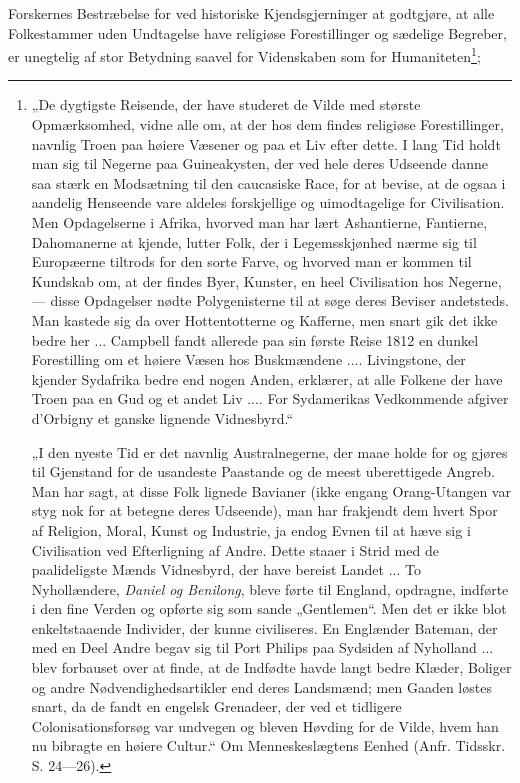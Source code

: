 \documentclass[12pt,a4paper]{book}
\begin{document}
Forskernes Bestræbelse for ved historiske Kjendsgjerninger at godtgjøre, at alle
Folkestammer uden Undtagelse have religiøse Forestillinger og sædelige Begreber,
er unegtelig af stor Betydning saavel for Videnskaben som for
Humaniteten\footnote{„De dygtigste Reisende, der have studeret de Vilde med
største Opmærksomhed, vidne alle om, at der hos dem findes religiøse
Forestillinger, navnlig Troen paa høiere Væsener og paa et Liv efter dette. I
lang Tid holdt man sig til Negerne paa Guineakysten, der ved hele deres Udseende
danne saa stærk en Modsætning til den caucasiske Race, for at bevise, at de
ogsaa i aandelig Henseende vare aldeles forskjellige og uimodtagelige for
Civilisation. Men Opdagelserne i Afrika, hvorved man har lært Ashantierne,
Fantierne, Dahomanerne at kjende, lutter Folk, der i Legemsskjønhed nærme sig
til Europæerne tiltrods for den sorte Farve, og hvorved man er kommen til
Kundskab om, at der findes Byer, Kunster, en heel Civilisation hos Negerne, ---
disse Opdagelser nødte Polygenisterne til at søge deres Beviser andetsteds. Man
kastede sig da over Hottentotterne og Kafferne, men snart gik det ikke bedre her
... Campbell fandt allerede paa sin første Reise 1812 en dunkel Forestilling om
et høiere Væsen hos Buskmændene .... Livingstone, der kjender Sydafrika bedre
end nogen Anden, erklærer, at alle Folkene der have Troen paa en Gud og et andet
Liv .... For Sydamerikas Vedkommende afgiver d'Orbigny et ganske lignende
Vidnesbyrd.“

„I den nyeste Tid er det navnlig Australnegerne, der maae holde for og gjøres
til Gjenstand for de usandeste Paastande og de meest uberettigede Angreb. Man
har sagt, at disse Folk lignede Bavianer (ikke engang Orang-Utangen var styg nok
for at betegne deres Udseende), man har frakjendt dem hvert Spor af Religion,
Moral, Kunst og Industrie, ja endog Evnen til at hæve sig i Civilisation ved
Efterligning af Andre. Dette staaer i Strid med de paalideligste Mænds
Vidnesbyrd, der have bereist Landet ... To Nyhollændere, \emph{Daniel og
Benilong}, bleve førte til England, opdragne, indførte i den fine Verden og
opførte sig som sande „Gentlemen“. Men det er ikke blot enkeltstaaende
Individer, der kunne civiliseres. En Englænder Bateman, der med en Deel Andre
begav sig til Port Philips paa Sydsiden af Nyholland ... blev forbauset over at
finde, at de Indfødte havde langt bedre Klæder, Boliger og andre
Nødvendighedsartikler end deres Landsmænd; men Gaaden løstes snart, da de fandt
en engelsk Grenadeer, der ved et tidligere Colonisationsforsøg var undvegen og
bleven Høvding for de Vilde, hvem han nu bibragte en høiere Cultur.“ Om
Menneskeslægtens Eenhed (Anfr. Tidsskr. S. 24---26).};
\end{document}
